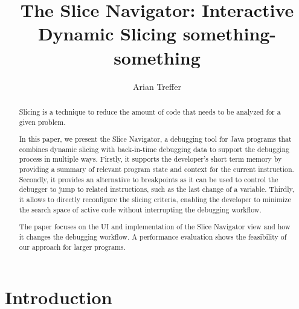﻿\documentclass[
      english,
			conference,
      ]{IEEEtran}
\title{The Slice Navigator: Interactive Dynamic Slicing something-something}
\author{Arian Treffer}
\begin{document}
\maketitle

\begin{abstract}
%
%

Slicing is a technique to reduce the amount of code that needs to be analyzed for a given problem.

In this paper, we present the Slice Navigator, a debugging tool for Java programs that combines dynamic slicing with back-in-time debugging data to support the debugging process in multiple ways.
Firstly, it supports the developer's short term memory by providing a summary of relevant program state and context for the current instruction.
Secondly, it provides an alternative to breakpoints as it can be used to control the debugger to jump to related instructions, such as the last change of a variable.
Thirdly, it allows to directly reconfigure the slicing criteria, enabling the developer to minimize the search space of active code without interrupting the debugging workflow.

The paper focuses on the UI and implementation of the Slice Navigator view and how it changes the debugging workflow.
A performance evaluation shows the feasibility of our approach for larger programs.

\end{abstract}

\section{Introduction}
\label{sec:introduction}
\end{document}
